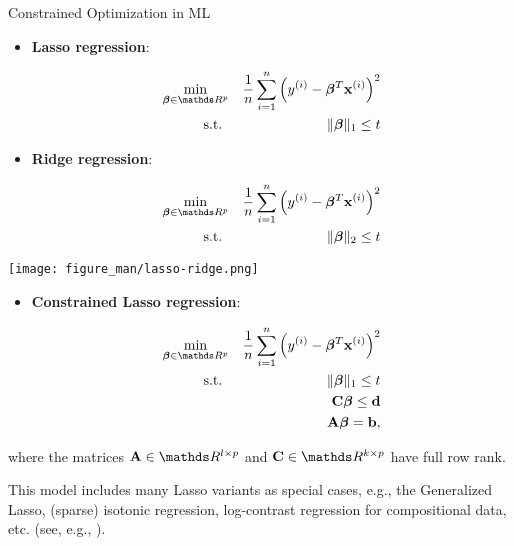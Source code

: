 \documentclass[11pt,compress,t,notes=noshow, xcolor=table]{beamer}
\begin{document}
\begin{vbframe}{Constrained Optimization in ML}

\begin{itemize}
\item \textbf{Lasso regression}:

\begin{eqnarray*}
\min_{\bm{\beta}\in \R^p} && \frac{1}{n}\sum_{i = 1}^n\left(y^{(i)} - \bm{\beta}^T\xv^{(i)}\right)^2 \\
\text{s.t. } && \|\bm{\beta}\|_1 \le t
\end{eqnarray*}

\item \textbf{Ridge regression}:

\begin{eqnarray*}
\min_{\bm{\beta}\in \R^p} && \frac{1}{n}\sum_{i = 1}^n\left(y^{(i)} - \bm{\beta}^T\xv^{(i)}\right)^2 \\
\text{s.t. } &&\|\bm{\beta}\|_2 \le t
\end{eqnarray*}
\end{itemize}

\begin{center}
	\texttt{[image: figure\_man/lasso-ridge.png]}
\end{center}

\framebreak


\begin{itemize}
\item \textbf{Constrained Lasso regression}:

\begin{eqnarray*}
\min_{\bm{\beta}\in \R^p} && \frac{1}{n}\sum_{i = 1}^n\left(y^{(i)} - \bm{\beta}^T\xv^{(i)}\right)^2 \\
\text{s.t. } && \|\bm{\beta}\|_1 \le t\\
             && \mathbf{C}\bm{\beta} \le \mathbf{d}\\
             && \Amat\bm{\beta} = \mathbf{b}, 
\end{eqnarray*}
\end{itemize}

where the matrices $\Amat\in \R^{l \times p}$ and $\mathbf{C} \in \R^{k \times p}$ have full row rank. 
\lz 

This model includes many Lasso variants as special cases, e.g., the Generalized Lasso, (sparse) isotonic regression, log-contrast regression for compositional data, etc. (see, e.g., \href{https://hua-zhou.github.io/media/pdf/GainesKimZhou08CLasso.pdf}{}). 


\end{vbframe}
\end{document}
